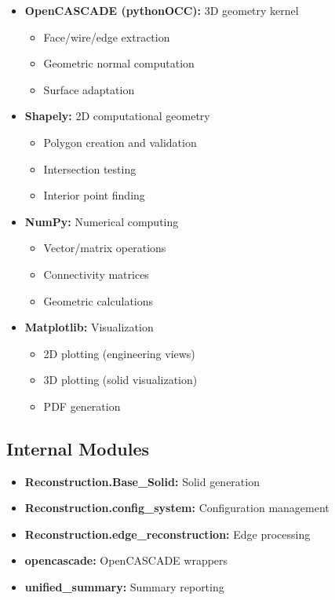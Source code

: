 \documentclass[11pt,a4paper]{article}
\begin{document}
\begin{itemize}
    \item \textbf{OpenCASCADE (pythonOCC):} 3D geometry kernel
    \begin{itemize}
        \item Face/wire/edge extraction
        \item Geometric normal computation
        \item Surface adaptation
    \end{itemize}
    
    \item \textbf{Shapely:} 2D computational geometry
    \begin{itemize}
        \item Polygon creation and validation
        \item Intersection testing
        \item Interior point finding
    \end{itemize}
    
    \item \textbf{NumPy:} Numerical computing
    \begin{itemize}
        \item Vector/matrix operations
        \item Connectivity matrices
        \item Geometric calculations
    \end{itemize}
    
    \item \textbf{Matplotlib:} Visualization
    \begin{itemize}
        \item 2D plotting (engineering views)
        \item 3D plotting (solid visualization)
        \item PDF generation
    \end{itemize}
\end{itemize}

\subsection{Internal Modules}

\begin{itemize}
    \item \textbf{Reconstruction.Base\_Solid:} Solid generation
    \item \textbf{Reconstruction.config\_system:} Configuration management
    \item \textbf{Reconstruction.edge\_reconstruction:} Edge processing
    \item \textbf{opencascade:} OpenCASCADE wrappers
    \item \textbf{unified\_summary:} Summary reporting
\end{itemize}
\end{document}
